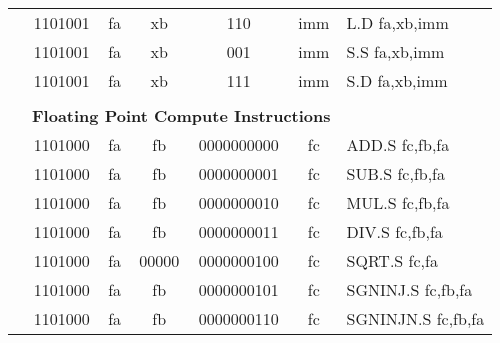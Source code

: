 \begin{table}[p]
\begin{small}
\begin{center}
\begin{tabular}{rcccccccccl}
&
\multicolumn{2}{|c|}{1101001} &
\multicolumn{1}{c|}{fa} &
\multicolumn{1}{c|}{xb} &
\multicolumn{1}{c|}{110} &
\multicolumn{4}{c|}{imm} & L.D fa,xb,imm \\
\cline{2-10}
  

&
\multicolumn{2}{|c|}{1101001} &
\multicolumn{1}{c|}{fa} &
\multicolumn{1}{c|}{xb} &
\multicolumn{1}{c|}{001} &
\multicolumn{4}{c|}{imm} & S.S fa,xb,imm \\
\cline{2-10}
  

&
\multicolumn{2}{|c|}{1101001} &
\multicolumn{1}{c|}{fa} &
\multicolumn{1}{c|}{xb} &
\multicolumn{1}{c|}{111} &
\multicolumn{4}{c|}{imm} & S.D fa,xb,imm \\
\cline{2-10}
  

&
\multicolumn{9}{c}{} & \\
&
\multicolumn{9}{c}{\bf Floating Point Compute Instructions} & \\
\cline{2-10}
  

&
\multicolumn{2}{|c|}{1101000} &
\multicolumn{1}{c|}{fa} &
\multicolumn{1}{c|}{fb} &
\multicolumn{4}{c|}{0000000000} &
\multicolumn{1}{c|}{fc} & ADD.S fc,fb,fa \\
\cline{2-10}
  

&
\multicolumn{2}{|c|}{1101000} &
\multicolumn{1}{c|}{fa} &
\multicolumn{1}{c|}{fb} &
\multicolumn{4}{c|}{0000000001} &
\multicolumn{1}{c|}{fc} & SUB.S fc,fb,fa \\
\cline{2-10}
  

&
\multicolumn{2}{|c|}{1101000} &
\multicolumn{1}{c|}{fa} &
\multicolumn{1}{c|}{fb} &
\multicolumn{4}{c|}{0000000010} &
\multicolumn{1}{c|}{fc} & MUL.S fc,fb,fa \\
\cline{2-10}
  

&
\multicolumn{2}{|c|}{1101000} &
\multicolumn{1}{c|}{fa} &
\multicolumn{1}{c|}{fb} &
\multicolumn{4}{c|}{0000000011} &
\multicolumn{1}{c|}{fc} & DIV.S fc,fb,fa \\
\cline{2-10}
  

&
\multicolumn{2}{|c|}{1101000} &
\multicolumn{1}{c|}{fa} &
\multicolumn{1}{c|}{00000} &
\multicolumn{4}{c|}{0000000100} &
\multicolumn{1}{c|}{fc} & SQRT.S fc,fa \\
\cline{2-10}
  

&
\multicolumn{2}{|c|}{1101000} &
\multicolumn{1}{c|}{fa} &
\multicolumn{1}{c|}{fb} &
\multicolumn{4}{c|}{0000000101} &
\multicolumn{1}{c|}{fc} & SGNINJ.S fc,fb,fa \\
\cline{2-10}
  

&
\multicolumn{2}{|c|}{1101000} &
\multicolumn{1}{c|}{fa} &
\multicolumn{1}{c|}{fb} &
\multicolumn{4}{c|}{0000000110} &
\multicolumn{1}{c|}{fc} & SGNINJN.S fc,fb,fa \\
\cline{2-10}
  


\end{tabular}
\end{center}
\end{small}
\end{table}

